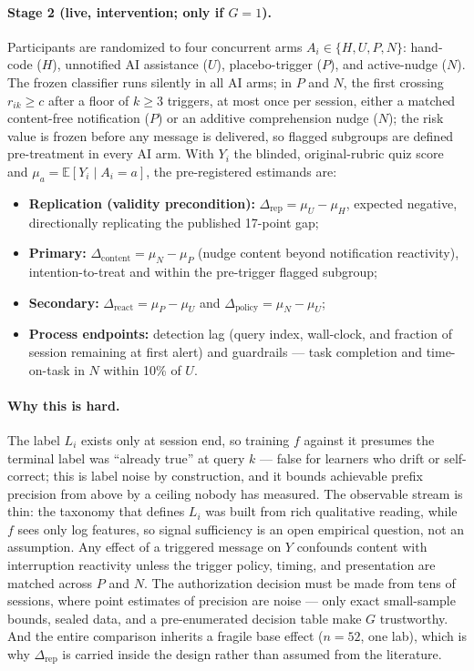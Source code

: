 \documentclass[11pt]{article}
\begin{document}
\paragraph{Stage 2 (live, intervention; only if $G = 1$).}
Participants are randomized to four concurrent arms $A_i \in \{H, U, P, N\}$: hand-code ($H$), unnotified AI assistance ($U$), placebo-trigger ($P$), and active-nudge ($N$). The frozen classifier runs silently in all AI arms; in $P$ and $N$, the first crossing $r_{ik} \geq c$ after a floor of $k \geq 3$ triggers, at most once per session, either a matched content-free notification ($P$) or an additive comprehension nudge ($N$); the risk value is frozen before any message is delivered, so flagged subgroups are defined pre-treatment in every AI arm. With $Y_i$ the blinded, original-rubric quiz score and $\mu_a = \mathbb{E}[Y_i \mid A_i = a]$, the pre-registered estimands are:
\begin{itemize}
  \item \textbf{Replication (validity precondition):} $\Delta_{\mathrm{rep}} = \mu_U - \mu_H$, expected negative, directionally replicating the published 17-point gap;
  \item \textbf{Primary:} $\Delta_{\mathrm{content}} = \mu_N - \mu_P$ (nudge content beyond notification reactivity), intention-to-treat and within the pre-trigger flagged subgroup;
  \item \textbf{Secondary:} $\Delta_{\mathrm{react}} = \mu_P - \mu_U$ and $\Delta_{\mathrm{policy}} = \mu_N - \mu_U$;
  \item \textbf{Process endpoints:} detection lag (query index, wall-clock, and fraction of session remaining at first alert) and guardrails --- task completion and time-on-task in $N$ within 10\% of $U$.
\end{itemize}

\paragraph{Why this is hard.}
The label $L_i$ exists only at session end, so training $f$ against it presumes the terminal label was ``already true'' at query $k$ --- false for learners who drift or self-correct; this is label noise by construction, and it bounds achievable prefix precision from above by a ceiling nobody has measured. The observable stream is thin: the taxonomy that defines $L_i$ was built from rich qualitative reading, while $f$ sees only log features, so signal sufficiency is an open empirical question, not an assumption. Any effect of a triggered message on $Y$ confounds content with interruption reactivity unless the trigger policy, timing, and presentation are matched across $P$ and $N$. The authorization decision must be made from tens of sessions, where point estimates of precision are noise --- only exact small-sample bounds, sealed data, and a pre-enumerated decision table make $G$ trustworthy. And the entire comparison inherits a fragile base effect ($n = 52$, one lab), which is why $\Delta_{\mathrm{rep}}$ is carried inside the design rather than assumed from the literature.
\end{document}
